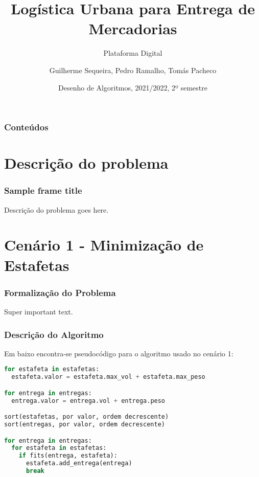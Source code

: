\documentclass{beamer}
\title[Plataforma Digital]
{Logística Urbana para Entrega de Mercadorias}
\subtitle{Plataforma Digital}
\author[Grupo 30, 2LEIC03]
{Guilherme Sequeira, Pedro Ramalho, Tomás Pacheco}
\institute[FEUP]
{
  Faculdade de Engenheria\\
  Universidade do Porto
}
\date[2021/2022 2S]
{Desenho de Algoritmos, 2021/2022, 2º semestre}
\begin{document}

\frame{\titlepage}



\begin{frame}
  \frametitle{Conteúdos}
  \tableofcontents
\end{frame}






\section{Descrição do problema}


\begin{frame}[fragile]
\frametitle{Sample frame title}
Descrição do problema goes here.  
\end{frame}








\section{Cenário 1 - Minimização de Estafetas}

\begin{frame}
\frametitle{Formalização do Problema}
Super important text.
\end{frame}

\begin{frame}[fragile]
\frametitle{Descrição do Algoritmo}
Em baixo encontra-se pseudocódigo para o algoritmo usado no cenário 1:
\begin{lstlisting}[language=python]
for estafeta in estafetas:
  estafeta.valor = estafeta.max_vol + estafeta.max_peso

for entrega in entregas:
  entrega.valor = entrega.vol + entrega.peso

sort(estafetas, por valor, ordem decrescente)
sort(entregas, por valor, ordem decrescente)

for entrega in entregas:
  for estafeta in estafetas:
    if fits(entrega, estafeta):
      estafeta.add_entrega(entrega)
      break
\end{lstlisting}
\end{frame}
\end{document}
